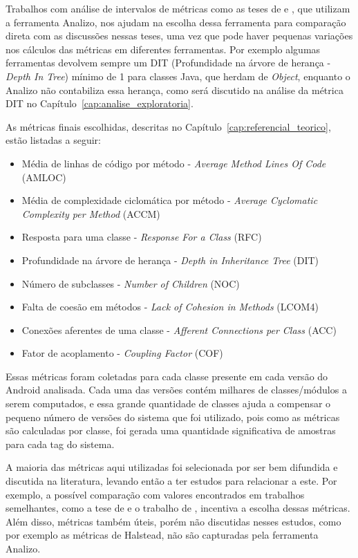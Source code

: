 Trabalhos com análise de intervalos de métricas como as teses de  e , que utilizam a ferramenta Analizo, nos ajudam na escolha dessa ferramenta para comparação direta com as discussões nessas teses, uma vez que pode haver pequenas variações nos cálculos das métricas em diferentes ferramentas. Por exemplo algumas ferramentas devolvem sempre um DIT (Profundidade na árvore de herança - \textit{Depth In Tree}) mínimo de 1 para classes Java, que herdam de \textit{Object}, enquanto o Analizo não contabiliza essa herança, como será discutido na análise da métrica DIT no Capítulo~\ref{cap:analise_exploratoria}.

As métricas finais escolhidas, descritas no Capítulo~\ref{cap:referencial_teorico}, estão listadas a seguir:

\begin{itemize}
\item Média de linhas de código por método - \textit{Average Method Lines Of Code} (AMLOC)
\item Média de complexidade ciclomática por método - \textit{Average Cyclomatic Complexity per Method} (ACCM)
\item Resposta para uma classe - \textit{Response For a Class} (RFC)
\item Profundidade na árvore de herança - \textit{Depth in Inheritance Tree} (DIT)
\item Número de subclasses - \textit{Number of Children} (NOC)
\item Falta de coesão em métodos - \textit{Lack of Cohesion in Methods} (LCOM4)
\item Conexões aferentes de uma classe - \textit{Afferent Connections per Class} (ACC)
\item Fator de acoplamento - \textit{Coupling Factor} (COF)
\end{itemize}

Essas métricas foram coletadas para cada classe presente em cada versão do Android analisada. Cada uma das versões contém milhares de classes/módulos a serem computados, e essa grande quantidade de classes ajuda a compensar o pequeno número de versões do sistema que foi utilizado, pois como as métricas são calculadas por classe, foi gerada uma quantidade significativa de amostras para cada tag do sistema.

A maioria das métricas aqui utilizadas foi selecionada por ser bem difundida e discutida na literatura, levando então a ter estudos para relacionar a este. Por exemplo, a possível comparação com valores encontrados em trabalhos semelhantes, como a tese de  e o trabalho de , incentiva a escolha dessas métricas. Além disso, métricas também úteis, porém não discutidas nesses estudos, como por exemplo as métricas de Halstead, não são capturadas pela ferramenta Analizo.

